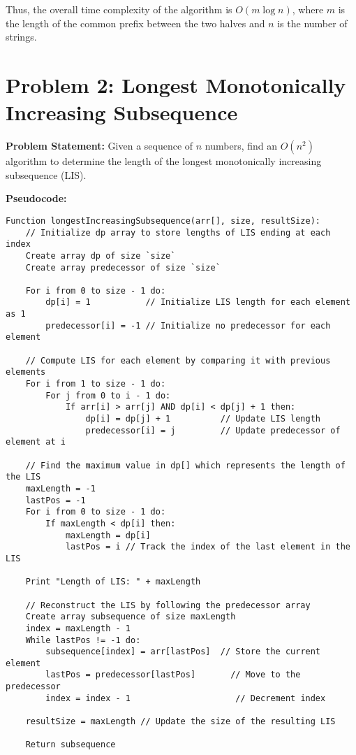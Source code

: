 \documentclass[a4paper,12pt]{report}
\begin{document}
Thus, the overall time complexity of the algorithm is \(O(m \log n)\), where \(m\) is the length of the common prefix between the two halves and \(n\) is the number of strings.

\newpage
\section*{Problem 2: Longest Monotonically Increasing Subsequence}
\textbf{Problem Statement:}  
Given a sequence of \( n \) numbers, find an \( O(n^2) \) algorithm to determine the length of the longest monotonically increasing subsequence (LIS).

\textbf{Pseudocode:}

\begin{tcolorbox}[colback=white, colframe=black, boxrule=0.5pt] %
\ttfamily\small  %
\begin{verbatim}
Function longestIncreasingSubsequence(arr[], size, resultSize):
    // Initialize dp array to store lengths of LIS ending at each index
    Create array dp of size `size`
    Create array predecessor of size `size`

    For i from 0 to size - 1 do:
        dp[i] = 1           // Initialize LIS length for each element as 1
        predecessor[i] = -1 // Initialize no predecessor for each element

    // Compute LIS for each element by comparing it with previous elements
    For i from 1 to size - 1 do:
        For j from 0 to i - 1 do:
            If arr[i] > arr[j] AND dp[i] < dp[j] + 1 then:
                dp[i] = dp[j] + 1          // Update LIS length
                predecessor[i] = j         // Update predecessor of element at i

    // Find the maximum value in dp[] which represents the length of the LIS
    maxLength = -1
    lastPos = -1
    For i from 0 to size - 1 do:
        If maxLength < dp[i] then:
            maxLength = dp[i]
            lastPos = i // Track the index of the last element in the LIS

    Print "Length of LIS: " + maxLength

    // Reconstruct the LIS by following the predecessor array
    Create array subsequence of size maxLength
    index = maxLength - 1
    While lastPos != -1 do:
        subsequence[index] = arr[lastPos]  // Store the current element
        lastPos = predecessor[lastPos]       // Move to the predecessor
        index = index - 1                     // Decrement index

    resultSize = maxLength // Update the size of the resulting LIS

    Return subsequence
\end{verbatim}
\end{tcolorbox}
\newpage
\end{document}
